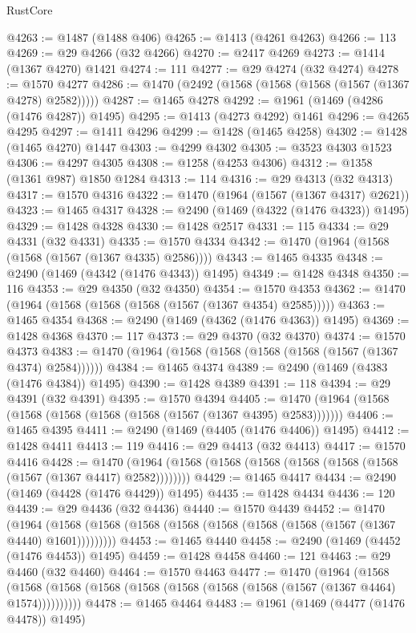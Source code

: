 \begin{lexlean}{RustCore}
\begin{coremodule}
@4263 := @1487 (@1488 @406)
@4265 := @1413 (@4261 @4263)
@4266 := 113
@4269 := @29 @4266 (@32 @4266)
@4270 := @2417 @4269
@4273 := @1414 (@1367 @4270) @1421
@4274 := 111
@4277 := @29 @4274 (@32 @4274)
@4278 := @1570 @4277
@4286 := @1470 (@2492 (@1568 (@1568 (@1568 (@1567 (@1367 @4278) @2582)))))
@4287 := @1465 @4278
@4292 := @1961 (@1469 (@4286 (@1476 @4287)) @1495)
@4295 := @1413 (@4273 @4292) @1461
@4296 := @4265 @4295
@4297 := @1411 @4296
@4299 := @1428 (@1465 @4258)
@4302 := @1428 (@1465 @4270) @1447
@4303 := @4299 @4302
@4305 := @3523 @4303 @1523
@4306 := @4297 @4305
@4308 := @1258 (@4253 @4306)
@4312 := @1358 (@1361 @987) @1850 @1284
@4313 := 114
@4316 := @29 @4313 (@32 @4313)
@4317 := @1570 @4316
@4322 := @1470 (@1964 (@1567 (@1367 @4317) @2621))
@4323 := @1465 @4317
@4328 := @2490 (@1469 (@4322 (@1476 @4323)) @1495)
@4329 := @1428 @4328
@4330 := @1428 @2517
@4331 := 115
@4334 := @29 @4331 (@32 @4331)
@4335 := @1570 @4334
@4342 := @1470 (@1964 (@1568 (@1568 (@1567 (@1367 @4335) @2586))))
@4343 := @1465 @4335
@4348 := @2490 (@1469 (@4342 (@1476 @4343)) @1495)
@4349 := @1428 @4348
@4350 := 116
@4353 := @29 @4350 (@32 @4350)
@4354 := @1570 @4353
@4362 := @1470 (@1964 (@1568 (@1568 (@1568 (@1567 (@1367 @4354) @2585)))))
@4363 := @1465 @4354
@4368 := @2490 (@1469 (@4362 (@1476 @4363)) @1495)
@4369 := @1428 @4368
@4370 := 117
@4373 := @29 @4370 (@32 @4370)
@4374 := @1570 @4373
@4383 := @1470 (@1964 (@1568 (@1568 (@1568 (@1568 (@1567 (@1367 @4374) @2584))))))
@4384 := @1465 @4374
@4389 := @2490 (@1469 (@4383 (@1476 @4384)) @1495)
@4390 := @1428 @4389
@4391 := 118
@4394 := @29 @4391 (@32 @4391)
@4395 := @1570 @4394
@4405 := @1470 (@1964 (@1568 (@1568 (@1568 (@1568 (@1568 (@1567 (@1367 @4395) @2583)))))))
@4406 := @1465 @4395
@4411 := @2490 (@1469 (@4405 (@1476 @4406)) @1495)
@4412 := @1428 @4411
@4413 := 119
@4416 := @29 @4413 (@32 @4413)
@4417 := @1570 @4416
@4428 := @1470 (@1964 (@1568 (@1568 (@1568 (@1568 (@1568 (@1568 (@1567 (@1367 @4417) @2582))))))))
@4429 := @1465 @4417
@4434 := @2490 (@1469 (@4428 (@1476 @4429)) @1495)
@4435 := @1428 @4434
@4436 := 120
@4439 := @29 @4436 (@32 @4436)
@4440 := @1570 @4439
@4452 := @1470
    (@1964 (@1568 (@1568 (@1568 (@1568 (@1568 (@1568 (@1568 (@1567 (@1367 @4440) @1601)))))))))
@4453 := @1465 @4440
@4458 := @2490 (@1469 (@4452 (@1476 @4453)) @1495)
@4459 := @1428 @4458
@4460 := 121
@4463 := @29 @4460 (@32 @4460)
@4464 := @1570 @4463
@4477 := @1470
    (@1964
      (@1568 (@1568 (@1568 (@1568 (@1568 (@1568 (@1568 (@1568 (@1567 (@1367 @4464) @1574))))))))))
@4478 := @1465 @4464
@4483 := @1961 (@1469 (@4477 (@1476 @4478)) @1495)

\end{coremodule}
\end{lexlean}
